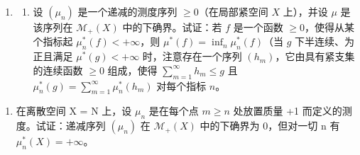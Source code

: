 \begin{enumerate}
\def\labelenumi{\arabic{enumi})}
\setcounter{enumi}{7}
\tightlist
\item
  \begin{enumerate}
  \def\labelenumii{\alph{enumii})}
  \tightlist
  \item
    设 \((\mu_n)\) 是一个递减的测度序列 \(\geqslant 0\)（在局部紧空间 \(X\) 上），并设 \(\mu\) 是该序列在 \(\mathcal{M}_+(X)\) 中的下确界。试证：若 \(f\) 是一个函数 \(\geqslant 0\)，使得从某个指标起 \(\mu_n^*(f) < +\infty\)，则 \(\mu^*(f) = \inf_n \mu_n^*(f)\)（当 \(g\) 下半连续、为正且满足 \(\mu^*(g) < +\infty\) 时，注意存在一个序列 \((h_m)\)，它由具有紧支集的连续函数 \(\geqslant 0\) 组成，使得 \(\sum_{m=1}^{\infty} h_m \leqslant g\) 且 \(\mu_n^*(g) = \sum_{m=1}^{\infty} \mu_n^*(h_m)\) 对每个指标 \(n\)。
  \end{enumerate}
\end{enumerate}

\begin{enumerate}
\def\labelenumi{\alph{enumi})}
\setcounter{enumi}{1}
\tightlist
\item
  在离散空间 X = N 上，设 \(\mu_{n}\) 是在每个点 \(m \geqslant n\) 处放置质量 +1 而定义的测度。试证：递减序列 \((\mu_{n})\) 在 \(\mathcal{M}_{+}(X)\) 中的下确界为 0，但对一切 n 有 \(\mu_{n}^{*}(X) = +\infty\)。
\end{enumerate}

\setcounter{exercisegroup}{3}
\edef\CurrentExerciseGroup{\arabic{exercisegroup}}
